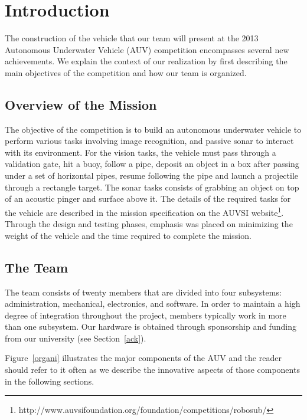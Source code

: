 \section{Introduction} 

The construction of the vehicle that our team will present at the
2013 Autonomous Underwater Vehicle (AUV) competition encompasses several new achievements. We explain the
context of our realization by first describing the main
objectives of the competition and how our team is organized.


\subsection{Overview of the Mission}

The objective of the competition is to build an autonomous underwater
vehicle to perform various tasks involving image recognition, and
passive sonar to
interact with its environment. For the vision tasks, the vehicle must 
pass through a validation gate, hit a buoy, follow a pipe, deposit an object
 in a box after passing under a set of horizontal pipes, resume following
 the pipe and launch a projectile through a rectangle target. The sonar tasks consists of
grabbing an object on top of an acoustic pinger and surface above it.
The details of the required tasks for the vehicle are described in the
 mission specification on the AUVSI website\footnote[1]{http://www.auvsifoundation.org/foundation/competitions/robosub/}.
 Through the design and testing phases, emphasis was placed on minimizing the weight 
 of the vehicle and the time required to complete the mission.

\subsection{The Team}
The team consists of twenty members that are divided into four subsystems: administration, mechanical, electronics, and software. In order to maintain a high degree of integration throughout the project, members typically work in more than one subsystem. Our hardware is obtained through sponsorship and funding from our university (see Section~\ref{ack}). 

Figure~\ref{organi} illustrates the major components of the AUV
and the reader should refer to it often as we describe the innovative
aspects of those components in the following sections.


